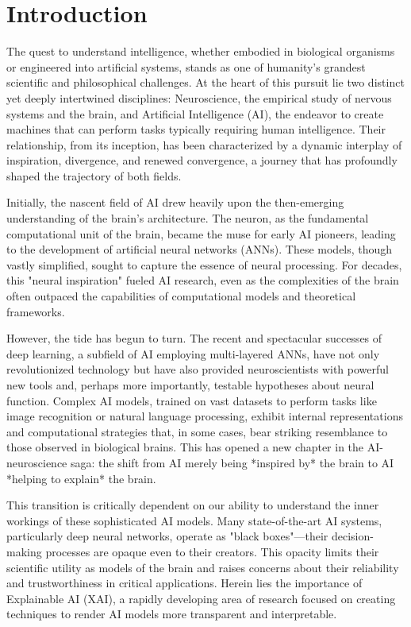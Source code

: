 \documentclass[11pt,a4paper]{article}
\begin{document}
\clearpage
\tableofcontents
\clearpage
{}


\section{Introduction}

The quest to understand intelligence, whether embodied in biological organisms or engineered into artificial systems, stands as one of humanity's grandest scientific and philosophical challenges. At the heart of this pursuit lie two distinct yet deeply intertwined disciplines: Neuroscience, the empirical study of nervous systems and the brain, and Artificial Intelligence (AI), the endeavor to create machines that can perform tasks typically requiring human intelligence. Their relationship, from its inception, has been characterized by a dynamic interplay of inspiration, divergence, and renewed convergence, a journey that has profoundly shaped the trajectory of both fields.

Initially, the nascent field of AI drew heavily upon the then-emerging understanding of the brain's architecture. The neuron, as the fundamental computational unit of the brain, became the muse for early AI pioneers, leading to the development of artificial neural networks (ANNs). These models, though vastly simplified, sought to capture the essence of neural processing. For decades, this "neural inspiration" fueled AI research, even as the complexities of the brain often outpaced the capabilities of computational models and theoretical frameworks.

However, the tide has begun to turn. The recent and spectacular successes of deep learning, a subfield of AI employing multi-layered ANNs, have not only revolutionized technology but have also provided neuroscientists with powerful new tools and, perhaps more importantly, testable hypotheses about neural function. Complex AI models, trained on vast datasets to perform tasks like image recognition or natural language processing, exhibit internal representations and computational strategies that, in some cases, bear striking resemblance to those observed in biological brains. This has opened a new chapter in the AI-neuroscience saga: the shift from AI merely being *inspired by* the brain to AI *helping to explain* the brain.

This transition is critically dependent on our ability to understand the inner workings of these sophisticated AI models. Many state-of-the-art AI systems, particularly deep neural networks, operate as "black boxes"—their decision-making processes are opaque even to their creators. This opacity limits their scientific utility as models of the brain and raises concerns about their reliability and trustworthiness in critical applications. Herein lies the importance of Explainable AI (XAI), a rapidly developing area of research focused on creating techniques to render AI models more transparent and interpretable.
\end{document}
